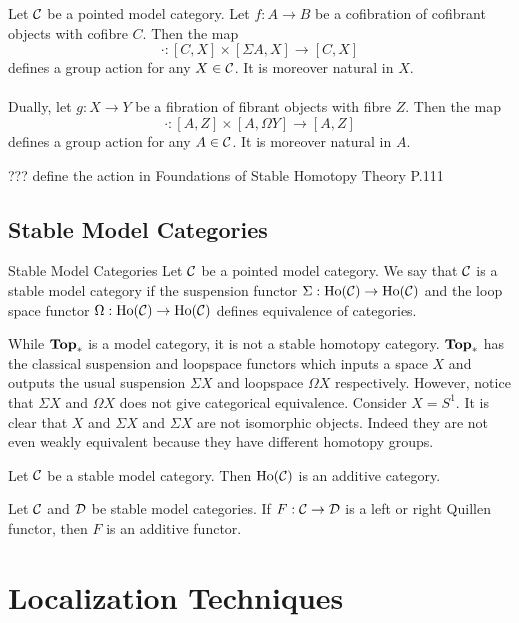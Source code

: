 \documentclass[a4paper]{article}
\begin{document}
\begin{thm}{}{} Let $\mathcal{C}$ be a pointed model category. Let $f:A\to B$ be a cofibration of cofibrant objects with cofibre $C$. Then the map $$\cdot:[C,X]\times[\Sigma A,X]\to[C,X]$$ defines a group action for any $X\in\mathcal{C}$. It is moreover natural in $X$. \\~\\

Dually, let $g:X\to Y$ be a fibration of fibrant objects with fibre $Z$. Then the map $$\cdot:[A,Z]\times[A,\Omega Y]\to[A,Z]$$ defines a group action for any $A\in\mathcal{C}$. It is moreover natural in $A$. 
\end{thm}

??? define the action in Foundations of Stable Homotopy Theory P.111

\subsection{Stable Model Categories}
\begin{defn}{Stable Model Categories}{} Let $\mathcal{C}$ be a pointed model category. We say that $\mathcal{C}$ is a stable model category if the suspension functor $\Sigma:\text{Ho}(\mathcal{C})\to\text{Ho}(\mathcal{C})$ and the loop space functor $\Omega:\text{Ho}(\mathcal{C})\to\text{Ho}(\mathcal{C})$ defines equivalence of categories. 
\end{defn}

While $\bold{Top}_\ast$ is a model category, it is not a stable homotopy category. $\bold{Top}_\ast$ has the classical suspension and loopspace functors which inputs a space $X$ and outputs the usual suspension $\Sigma X$ and loopspace $\Omega X$ respectively. However, notice that $\Sigma X$ and $\Omega X$ does not give categorical equivalence. Consider $X=S^1$. It is clear that $X$ and $\Sigma X$ and $\Sigma X$ are not isomorphic objects. Indeed they are not even weakly equivalent because they have different homotopy groups. 

\begin{thm}{}{} Let $\mathcal{C}$ be a stable model category. Then $\text{Ho}(\mathcal{C})$ is an additive category. 
\end{thm}

\begin{thm}{}{} Let $\mathcal{C}$ and $\mathcal{D}$ be stable model categories. If $F:\mathcal{C}\to\mathcal{D}$ is a left or right Quillen functor, then $F$ is an additive functor. 
\end{thm}

\pagebreak
\section{Localization Techniques}
\end{document}
